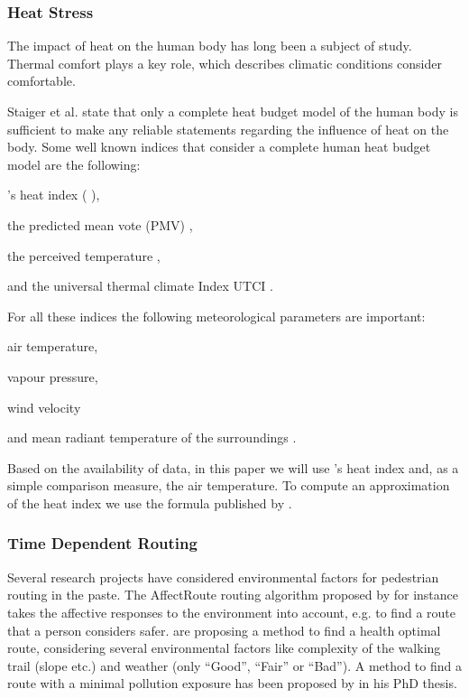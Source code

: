 \subsubsection{Heat Stress}
The impact of heat on the human body has long been a subject of study. Thermal comfort plays a key role, which describes climatic conditions consider comfortable. 

Staiger et al. \parencite{Staiger1997} state that only a complete heat budget model of the human body is sufficient to make any reliable statements regarding the influence of heat on the body. Some well known indices that consider a complete human heat budget model are the following:
\begin{inparaenum}[(1)]
  \item \citeauthor{Steadman1979}'s heat index (\citeauthor{Steadman1979} \citeyear*{Steadman1979}\citeyear*{Steadman1979a}),
  \item the predicted mean vote (PMV) \parencite{Fanger1973},
  \item the perceived temperature \parencite{Staiger1997,Jendritzky2000},
  \item and the universal thermal climate Index UTCI \parencite{Jendritzky2010}.
\end{inparaenum}

For all these indices the following meteorological parameters are important:
\begin{inparaenum}[(1)]
\item air temperature,
\item vapour pressure,
\item wind velocity 
\item and mean radiant temperature of the surroundings \parencite{Matzarakis1999}.
\end{inparaenum}

Based on the availability of data, in this paper we will use \citeauthor{Steadman1979}'s heat index \parencite{Steadman1979} and, as a simple comparison measure, the air temperature. To compute an approximation of the heat index we use the formula published by \textcite[77]{Stull2011}.  

\subsubsection{Time Dependent Routing}
Several research projects have considered environmental factors for pedestrian routing in the paste. The AffectRoute routing algorithm proposed by \textcite{Huang2014} for instance takes the affective responses to the environment into account, e.g. to find a route that a person considers safer.  \textcite{Sharker2012} are proposing a method to find a health optimal route, considering several environmental factors like complexity of the walking trail (slope etc.) and weather (only “Good”, “Fair” or “Bad”). A method to find a route with a minimal pollution exposure has been proposed by \textcite{Hasenfratz2015} in his PhD thesis.

